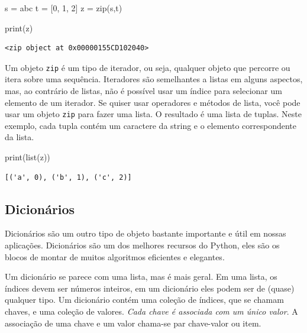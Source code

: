 \documentclass[
  brazilian,
  letterpaper,
  DIV=11,
  numbers=noendperiod]{scrreprt}
\newenvironment{Shaded}{\begin{snugshade}}{\end{snugshade}}
\newcommand{\BuiltInTok}[1]{\textcolor[rgb]{0.00,0.23,0.31}{#1}}
\newcommand{\DecValTok}[1]{\textcolor[rgb]{0.68,0.00,0.00}{#1}}
\newcommand{\NormalTok}[1]{\textcolor[rgb]{0.00,0.23,0.31}{#1}}
\newcommand{\OperatorTok}[1]{\textcolor[rgb]{0.37,0.37,0.37}{#1}}
\newcommand{\StringTok}[1]{\textcolor[rgb]{0.13,0.47,0.30}{#1}}
\begin{document}
\begin{Shaded}
\begin{Highlighting}[]
\NormalTok{s }\OperatorTok{=} \StringTok{\textquotesingle{}abc\textquotesingle{}}
\NormalTok{t }\OperatorTok{=}\NormalTok{ [}\DecValTok{0}\NormalTok{, }\DecValTok{1}\NormalTok{, }\DecValTok{2}\NormalTok{]}
\NormalTok{z }\OperatorTok{=} \BuiltInTok{zip}\NormalTok{(s,t)}

\BuiltInTok{print}\NormalTok{(z)}
\end{Highlighting}
\end{Shaded}

\begin{verbatim}
<zip object at 0x00000155CD102040>
\end{verbatim}

Um objeto \texttt{zip} é um tipo de iterador, ou seja, qualquer objeto
que percorre ou itera sobre uma sequência. Iteradores são semelhantes a
listas em alguns aspectos, mas, ao contrário de listas, não é possível
usar um índice para selecionar um elemento de um iterador. Se quiser
usar operadores e métodos de lista, você pode usar um objeto
\texttt{zip} para fazer uma lista. O resultado é uma lista de tuplas.
Neste exemplo, cada tupla contém um caractere da string e o elemento
correspondente da lista.

\begin{Shaded}
\begin{Highlighting}[]
\BuiltInTok{print}\NormalTok{(}\BuiltInTok{list}\NormalTok{(z))}
\end{Highlighting}
\end{Shaded}

\begin{verbatim}
[('a', 0), ('b', 1), ('c', 2)]
\end{verbatim}

\subsection{Dicionários}\label{dicionuxe1rios}

Dicionários são um outro tipo de objeto bastante importante e útil em
nossas aplicações. Dicionários são um dos melhores recursos do Python,
eles são os blocos de montar de muitos algoritmos eficientes e
elegantes.

Um dicionário se parece com uma lista, mas é mais geral. Em uma lista,
os índices devem ser números inteiros, em um dicionário eles podem ser
de (quase) qualquer tipo. Um dicionário contém uma coleção de índices,
que se chamam chaves, e uma coleção de valores. \emph{Cada chave é
associada com um único valor}. A associação de uma chave e um valor
chama-se par chave-valor ou item.
\end{document}
